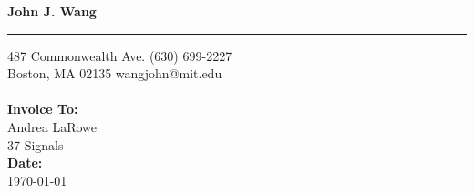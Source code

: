 \documentclass{invoice} %
\def \tab {\hspace*{3ex}} %
\begin{document}

\hfil{\Huge\bf John J. Wang}\hfil %
\bigskip\break %
\hrule %

487 Commonwealth Ave. \hfill (630) 699-2227 \\ %
Boston, MA 02135 \hfill wangjohn@mit.edu
\\ \\
{\bf Invoice To:} \\
\tab Andrea LaRowe \\ %
\tab 37 Signals \\ %

{\bf Date:} \\
\tab \today \\ %


\begin{invoiceTable}




\subtotal %


\end{invoiceTable}

\end{document}
